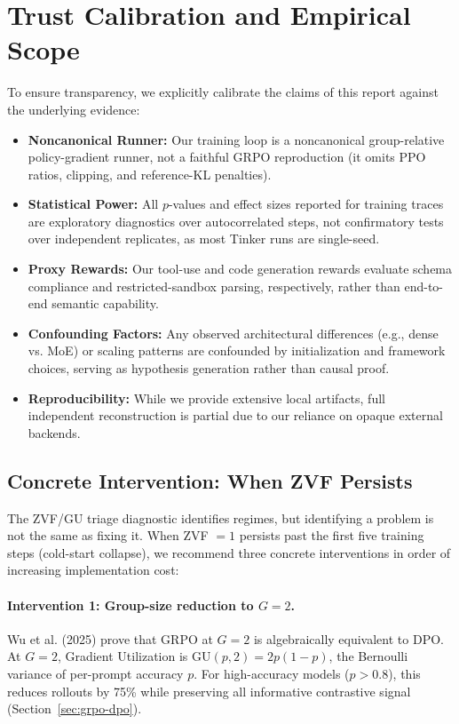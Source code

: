 \documentclass{article}
\begin{document}
\section*{Trust Calibration and Empirical Scope}
To ensure transparency, we explicitly calibrate the claims of this report against the underlying evidence:
\begin{itemize}
    \item \textbf{Noncanonical Runner:} Our training loop is a noncanonical group-relative policy-gradient runner, not a faithful GRPO reproduction (it omits PPO ratios, clipping, and reference-KL penalties).
    \item \textbf{Statistical Power:} All $p$-values and effect sizes reported for training traces are exploratory diagnostics over autocorrelated steps, not confirmatory tests over independent replicates, as most Tinker runs are single-seed.
    \item \textbf{Proxy Rewards:} Our tool-use and code generation rewards evaluate schema compliance and restricted-sandbox parsing, respectively, rather than end-to-end semantic capability.
    \item \textbf{Confounding Factors:} Any observed architectural differences (e.g., dense vs. MoE) or scaling patterns are confounded by initialization and framework choices, serving as hypothesis generation rather than causal proof.
    \item \textbf{Reproducibility:} While we provide extensive local artifacts, full independent reconstruction is partial due to our reliance on opaque external backends.
\end{itemize}

\subsection{Concrete Intervention: When ZVF Persists}
\label{sec:zvf_intervention}

The ZVF/GU triage diagnostic identifies regimes, but identifying a problem is
not the same as fixing it.  When ZVF $= 1$ persists past the first five
training steps (cold-start collapse), we recommend three concrete interventions
in order of increasing implementation cost:

\paragraph{Intervention 1: Group-size reduction to $G=2$.}
Wu et al. (2025) prove that GRPO at $G=2$ is algebraically equivalent to DPO.
At $G=2$, Gradient Utilization is GU$(p,2) = 2p(1-p)$, the Bernoulli variance of
per-prompt accuracy $p$.  For high-accuracy models ($p > 0.8$), this reduces
rollouts by 75\% while preserving all informative contrastive signal
(Section~\ref{sec:grpo-dpo}).
\end{document}
